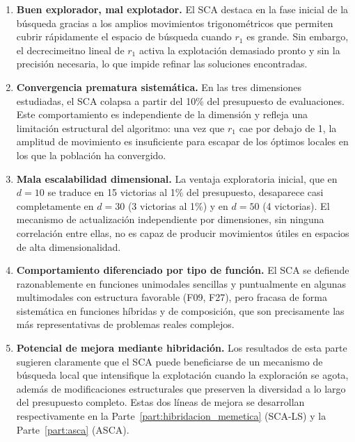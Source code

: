 \documentclass[12pt,a4paper]{article}
\begin{document}
\begin{enumerate}
    \item \textbf{Buen explorador, mal explotador.} El SCA destaca en la fase inicial de la búsqueda gracias a los amplios movimientos trigonométricos que permiten cubrir rápidamente el espacio de búsqueda cuando $r_1$ es grande. Sin embargo, el decrecimeitno lineal de $r_1$ activa la explotación demasiado pronto y sin la precisión necesaria, lo que impide refinar las soluciones encontradas.

    \item \textbf{Convergencia prematura sistemática.} En las tres dimensiones estudiadas, el SCA colapsa a partir del 10\% del presupuesto de evaluaciones. Este comportamiento es independiente de la dimensión y refleja una limitación estructural del algoritmo: una vez que $r_1$ cae por debajo de 1, la amplitud de movimiento es insuficiente para escapar de los óptimos locales en los que la población ha convergido.

    \item \textbf{Mala escalabilidad dimensional.} La ventaja exploratoria inicial, que en $d=10$ se traduce en 15 victorias al 1\% del presupuesto, desaparece casi completamente en $d=30$ (3 victorias al 1\%) y en $d=50$ (4 victorias). El mecanismo de actualización independiente por dimensiones, sin ninguna correlación entre ellas, no es capaz de producir movimientos útiles en espacios de alta dimensionalidad.

    \item \textbf{Comportamiento diferenciado por tipo de función.} El SCA se defiende razonablemente en funciones unimodales sencillas y puntualmente en algunas multimodales con estructura favorable (F09, F27), pero fracasa de forma sistemática en funciones híbridas y de composición, que son precisamente las más representativas de problemas reales complejos.

    \item \textbf{Potencial de mejora mediante hibridación.} Los resultados de esta parte sugieren claramente que el SCA puede beneficiarse de un mecanismo de búsqueda local que intensifique la explotación cuando la exploración se agota, además de modificaciones estructurales que preserven la diversidad a lo largo del presupuesto completo. Estas dos líneas de mejora se desarrollan respectivamente en la Parte~\ref{part:hibridacion_memetica} (SCA-LS) y la Parte~\ref{part:asca} (ASCA).
\end{enumerate}


\clearpage
\end{document}
